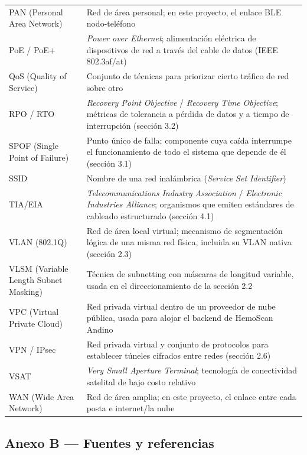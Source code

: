 \documentclass[11pt,a4paper]{article}
\begin{document}
{\begin{longtable}[]{@{}
  >{\raggedright\arraybackslash}p{}
  >{\raggedright\arraybackslash}p{}@{}}
PAN (Personal Area Network) & Red de área personal; en este proyecto, el enlace BLE nodo-teléfono \\
PoE / PoE+ & \emph{Power over Ethernet}; alimentación eléctrica de dispositivos de red a través del cable de datos (IEEE 802.3af/at) \\
QoS (Quality of Service) & Conjunto de técnicas para priorizar cierto tráfico de red sobre otro \\
RPO / RTO & \emph{Recovery Point Objective} / \emph{Recovery Time Objective}; métricas de tolerancia a pérdida de datos y a tiempo de interrupción (sección 3.2) \\
SPOF (Single Point of Failure) & Punto único de falla; componente cuya caída interrumpe el funcionamiento de todo el sistema que depende de él (sección 3.1) \\
SSID & Nombre de una red inalámbrica (\emph{Service Set Identifier}) \\
TIA/EIA & \emph{Telecommunications Industry Association} / \emph{Electronic Industries Alliance}; organismos que emiten estándares de cableado estructurado (sección 4.1) \\
VLAN (802.1Q) & Red de área local virtual; mecanismo de segmentación lógica de una misma red física, incluida su VLAN nativa (sección 2.3) \\
VLSM (Variable Length Subnet Masking) & Técnica de subnetting con máscaras de longitud variable, usada en el direccionamiento de la sección 2.2 \\
VPC (Virtual Private Cloud) & Red privada virtual dentro de un proveedor de nube pública, usada para alojar el backend de HemoScan Andino \\
VPN / IPsec & Red privada virtual y conjunto de protocolos para establecer túneles cifrados entre redes (sección 2.6) \\
VSAT & \emph{Very Small Aperture Terminal}; tecnología de conectividad satelital de bajo costo relativo \\
WAN (Wide Area Network) & Red de área amplia; en este proyecto, el enlace entre cada posta e internet/la nube \\
\end{longtable}
}

\subsection{Anexo B --- Fuentes y referencias}\label{anexo-b-fuentes-y-referencias}
\end{document}
